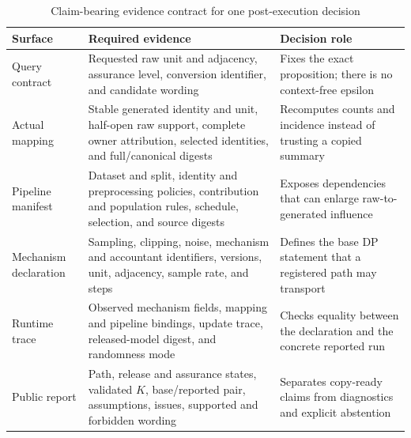 \begin{table}[tbp]
    \centering
    \caption{Claim-bearing evidence contract for one post-execution decision}
    \label{tab:ch2-evidence-contract}
    \footnotesize
    \setlength{\tabcolsep}{3pt}
    \renewcommand{\arraystretch}{1.13}
    \begin{tabular}{@{}
        >{\raggedright\arraybackslash}p{}
        >{\raggedright\arraybackslash}p{}
        >{\raggedright\arraybackslash}p{}@{}}
        \toprule
        \textbf{Surface} & \textbf{Required evidence} &
        \textbf{Decision role} \\
        \midrule
        Query contract &
        Requested raw unit and adjacency, assurance level, conversion identifier,
        and candidate wording &
        Fixes the exact proposition; there is no context-free epsilon \\

        Actual mapping &
        Stable generated identity and unit, half-open raw support, complete owner
        attribution, selected identities, and full/canonical digests &
        Recomputes counts and incidence instead of trusting a copied summary \\

        Pipeline manifest &
        Dataset and split, identity and preprocessing policies, contribution and
        population rules, schedule, selection, and source digests &
        Exposes dependencies that can enlarge raw-to-generated influence \\

        Mechanism declaration &
        Sampling, clipping, noise, mechanism and accountant identifiers, versions,
        unit, adjacency, sample rate, and steps &
        Defines the base DP statement that a registered path may transport \\

        Runtime trace &
        Observed mechanism fields, mapping and pipeline bindings, update trace,
        released-model digest, and randomness mode &
        Checks equality between the declaration and the concrete reported run \\

        Public report &
        Path, release and assurance states, validated \(K\), base/reported pair,
        assumptions, issues, supported and forbidden wording &
        Separates copy-ready claims from diagnostics and explicit abstention \\
        \bottomrule
    \end{tabular}
\end{table}

